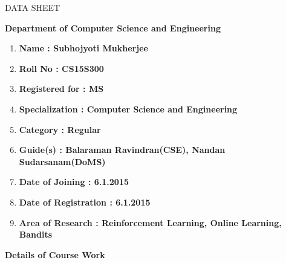 \documentclass[12pt]{article}
\begin{document}
\centerline{{\Large DATA SHEET}}
\centerline{{\bf Department of Computer Science and Engineering}}
\vspace{0.4cm}
\begin{enumerate}
  \item \textbf{Name :  Subhojyoti Mukherjee}
  \\
  \item \textbf{Roll No : CS15S300}
  \\ 
  \item \textbf{Registered for : MS}
  \\ 
  \item \textbf{Specialization : Computer Science and Engineering}
  \\
  \item \textbf{Category : Regular}
  \\ 
  \item \textbf{Guide(s) : Balaraman Ravindran(CSE), Nandan Sudarsanam(DoMS)}
  \\ 
  \item \textbf{Date of Joining : 6.1.2015}
  \\
  \item \textbf{Date of Registration : 6.1.2015}
  \\ 
 \item \textbf{Area of Research : Reinforcement Learning, Online Learning, Bandits} 
  
\end{enumerate}
\pagebreak
\textbf{Details of Course Work}\\
\end{document}
